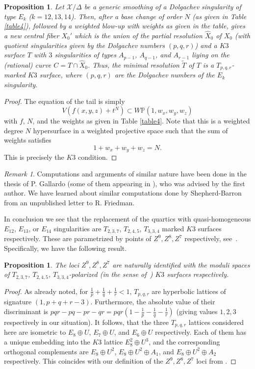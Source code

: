 \documentclass[11pt]{amsart}
\numberwithin{equation}{section}
\theoremstyle{plain}
\newtheorem{proposition}[theorem]{Proposition}
\theoremstyle{remark}
\newtheorem{remark}[theorem]{Remark}
\theoremstyle{definition}
\newcommand{\bP}{\mathbb{P}}
\newcommand{\sX}{\mathscr{X}}
\begin{document}
\begin{proposition}
Let $\sX/\Delta$ be a generic smoothing of a Dolgachev singularity of type $E_k$ ($k=12,13,14$). Then, after a base change of order $N$ (as given in Table \ref{table4}), followed by a weighted blow-up with weights as given in the table, gives a new central fiber $X_0'$ which is the union of the partial resolution $\widehat{X}_0$ of $X_0$ (with quotient singularities  given by the Dolgachev numbers $(p,q,r)$) and a $K3$ surface $T$ with $3$  singularities of types $A_{p-1}$, $A_{q-1}$, and $A_{r-1}$ liying on the (rational) curve $C=T\cap \widehat{X}_0$.  Thus, the minimal resolution $\widetilde{T}$ of $T$ is a $T_{p,q,r}$-marked $K3$ surface, where $(p,q,r)$ are the  Dolgachev numbers of the  $E_k$ singularity. 
\end{proposition}
\begin{proof}
The equation of the tail is simply 
$$V(f(x,y,z)+t^N)\subset W\bP(1,w_x,w_y,w_z)$$
with $f$, $N$, and the weights as given in Table  \ref{table4}. Note that this is a weighted degree $N$ hypersurface in a weighted projective space such that the sum of weights satisfies
$$1+w_x+w_y+w_z=N.$$
This is precisely the $K3$ condition. 
\end{proof}
\begin{remark}
Computations and arguments of similar nature have been done in the thesis of P. Gallardo (some of them appearing in \cite{gallardo}), who was advised by the first author. We have learned about similar computations done by Shepherd-Barron from an unpublished letter to R. Friedman. 
\end{remark}


In conclusion we see that  the replacement of the quartics with quasi-homogeneous $E_{12}$, $E_{13}$, or $E_{14}$ singularities are $T_{2,3,7}$, $T_{2,4,5}$, $T_{3,3,4}$ marked $K3$ surfaces respectively. These are parametrized by  points of $Z^9,Z^8,Z^7$ respectively, see~\cite{log1}. Specifically, we have the following result.
%
\begin{proposition}\label{prop:zloci}
%
The loci $Z^9,Z^8,Z^7$ are naturally identified  with the moduli spaces of $T_{2,3,7}$, $T_{2,4,5}$, $T_{3,3,4}$-polarized  (in the sense of~\cite{dolgachevm}) $K3$ surfaces respectively. 
%
\end{proposition} 
%
\begin{proof}
As already noted, for $\frac{1}{p}+\frac{1}{q}+\frac{1}{r}<1$,  $T_{p,q,r}$ are hyperbolic lattices of signature $(1, p+q+r-3)$. Furthermore, the absolute value of their discriminant is $pqr-pq-pr-qr=pqr\left(1-\frac{1}{p}-\frac{1}{q}-\frac{1}{r}\right)$ (giving values $1,2,3$ respectively in our situation). It follows, that the three $T_{p,q,r}$ lattices considered here are isometric to $E_8\oplus U$, $E_7\oplus U$, and $E_6\oplus U$ respectively. Each of them has a unique embedding into the $K3$ lattice $E_8^2\oplus U^3$, and the corresponding orthogonal complements are $E_8\oplus U^2$, $E_8\oplus U^2\oplus A_1$, and $E_8\oplus U^2\oplus A_2$ respectively. This coincides with our definition of the $Z^9,Z^8,Z^7$ loci from \cite{log1}.
\end{proof}
\end{document}
